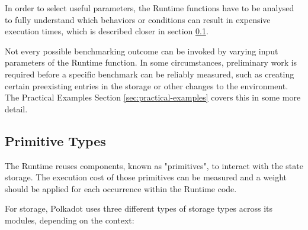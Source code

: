 \documentclass[11pt,a4paper]{article}
\begin{document}
In order to select useful parameters, the Runtime functions have to be analysed
to fully understand which behaviors or conditions can result in expensive
execution times, which is described closer in section
\ref{sect:primitive-types}.
\newline

Not every possible benchmarking outcome can be invoked by varying input
parameters of the Runtime function. In some circumstances, preliminary work is
required before a specific benchmark can be reliably measured, such as creating
certain preexisting entries in the storage or other changes to the environment.
The Practical Examples Section \ref{sec:practical-examples} covers this in some
more detail.

\subsection{Primitive Types}\label{sect:primitive-types}
The Runtime reuses components, known as "primitives", to interact with the state
storage. The execution cost of those primitives can be measured and a weight
should be applied for each occurrence within the Runtime code.
\newline

For storage, Polkadot uses three different types of storage types across its
modules, depending on the context:
\end{document}
